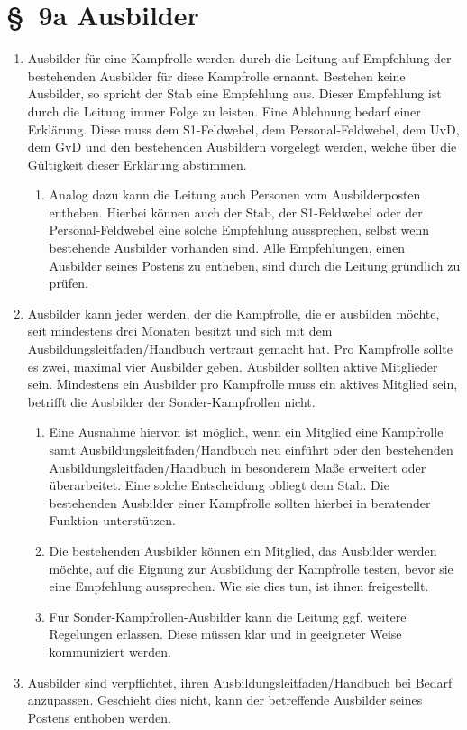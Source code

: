 \section*{\S~9a Ausbilder}
 
\label{sec:ausbilder}

\begin{enumerate}[label=(\arabic*)]
    \item Ausbilder für eine Kampfrolle werden durch die Leitung auf Empfehlung der bestehenden Ausbilder für diese Kampfrolle ernannt. Bestehen keine Ausbilder, so spricht der Stab eine Empfehlung aus. Dieser Empfehlung ist durch die Leitung immer Folge zu leisten. Eine Ablehnung bedarf einer Erklärung. Diese muss dem S1-Feldwebel, dem Personal-Feldwebel, dem UvD, dem GvD und den bestehenden Ausbildern vorgelegt werden, welche über die Gültigkeit dieser Erklärung abstimmen.
    \begin{enumerate}[label=(\Alph*)]
        \item Analog dazu kann die Leitung auch Personen vom Ausbilderposten entheben. Hierbei können auch der Stab, der S1-Feldwebel oder der Personal-Feldwebel eine solche Empfehlung aussprechen, selbst wenn bestehende Ausbilder vorhanden sind. Alle Empfehlungen, einen Ausbilder seines Postens zu entheben, sind durch die Leitung gründlich zu prüfen.
    \end{enumerate}
    \item Ausbilder kann jeder werden, der die Kampfrolle, die er ausbilden möchte, seit mindestens drei Monaten besitzt und sich mit dem Ausbildungsleitfaden/Handbuch vertraut gemacht hat. Pro Kampfrolle sollte es zwei, maximal vier Ausbilder geben. Ausbilder sollten aktive Mitglieder sein. Mindestens ein Ausbilder pro Kampfrolle muss ein aktives Mitglied sein, betrifft die Ausbilder der Sonder-Kampfrollen nicht.
    \begin{enumerate}[label=(\Alph*)]
        \item Eine Ausnahme hiervon ist möglich, wenn ein Mitglied eine Kampfrolle samt Ausbildungsleitfaden/Handbuch neu einführt oder den bestehenden Ausbildungsleitfaden/Handbuch in besonderem Maße erweitert oder überarbeitet. Eine solche Entscheidung obliegt dem Stab. Die bestehenden Ausbilder einer Kampfrolle sollten hierbei in beratender Funktion unterstützen.
        \item Die bestehenden Ausbilder können ein Mitglied, das Ausbilder werden möchte, auf die Eignung zur Ausbildung der Kampfrolle testen, bevor sie eine Empfehlung aussprechen. Wie sie dies tun, ist ihnen freigestellt.
        \item Für Sonder-Kampfrollen-Ausbilder kann die Leitung ggf. weitere Regelungen erlassen. Diese müssen klar und in geeigneter Weise kommuniziert werden.
    \end{enumerate}
    \item Ausbilder sind verpflichtet, ihren Ausbildungsleitfaden/Handbuch bei Bedarf anzupassen. Geschieht dies nicht, kann der betreffende Ausbilder seines Postens enthoben werden.
\end{enumerate}
